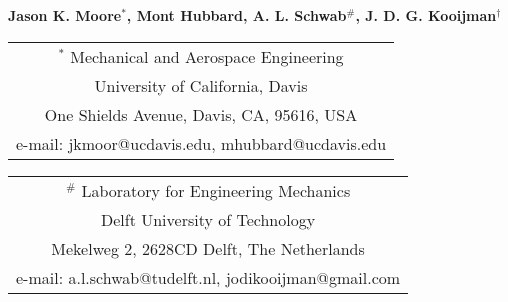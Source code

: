 \documentclass{bmd2010p}
\begin{document}
\begin{center}
\end{center}

\begin{center}
\normalsize{\bf{Jason K. Moore$^{*}$, Mont Hubbard, A. L. Schwab$^\#$,
            J. D. G. Kooijman$^\dag$}}
\end{center}

\begin{center}
\begin{tabular}{c}
$^*$ Mechanical and Aerospace Engineering\\
University of California, Davis\\
One Shields Avenue, Davis, CA, 95616, USA\\
e-mail: jkmoor@ucdavis.edu, mhubbard@ucdavis.edu\\
\end{tabular}
\begin{tabular}{c}
$^\#$ Laboratory for Engineering Mechanics\\
Delft University of Technology\\
Mekelweg 2, 2628CD Delft, The Netherlands\\
e-mail: a.l.schwab@tudelft.nl, jodikooijman@gmail.com\\
\end{tabular} \\ \vspace{2.5ex}

\end{center}
\end{document}
